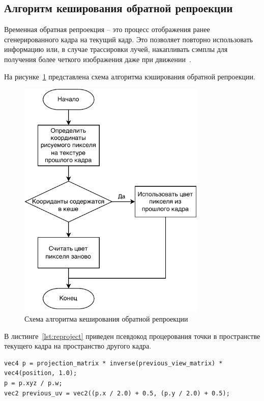 \subsection{Алгоритм кеширования обратной репроекции}

Временная обратная репроекция -- это процесс отображения ранее сгенерированного кадра на 
текущий кадр. Это позволяет повторно использовать информацию или, в случае трассировки 
лучей, накапливать сэмплы для получения более четкого изображения даже при 
движении~\cite{ARTSwRPC}.

На рисунке~\ref{img:rrc} представлена схема алгоритма кэширования обратной
репроекции.

\begin{figure}[H]
	\centering
	\includegraphics[width=90mm]{inc/pdf/rrc}
	\caption{Схема алгоритма кеширования обратной репроекции}
	\label{img:rrc}
\end{figure}

В листинге~\ref{lst:reproject} приведен псевдокод процерования точки в пространстве 
текущего кадра на пространство другого кадра.

\begin{lstlisting}[caption={Проецирование одного кадра на другой},label={lst:reproject},frame=single]
vec4 p = projection_matrix * inverse(previous_view_matrix) * vec4(position, 1.0);
p = p.xyz / p.w;
vec2 previous_uv = vec2((p.x / 2.0) + 0.5, (p.y / 2.0) + 0.5);
\end{lstlisting}

